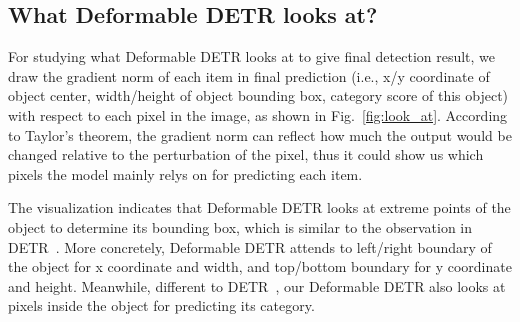 \documentclass{article}
\begin{document}
\subsection{What Deformable DETR looks at?}
\label{sec:look_at}

 For studying what Deformable DETR looks at to give final detection result, we draw the gradient norm of each item in final prediction (i.e., x/y coordinate of object center, width/height of object bounding box, category score of this object) with respect to each pixel in the image, as shown in Fig.~\ref{fig:look_at}. According to Taylor's theorem, the gradient norm can reflect how much the output would be changed relative to the perturbation of the pixel, thus it could show us which pixels the model mainly relys on for predicting each item. 

 The visualization indicates that Deformable DETR looks at extreme points of the object to determine its bounding box, which is similar to the observation in DETR~\citep{carion2020end}. More concretely, Deformable DETR attends to left/right boundary of the object for x coordinate and width, and top/bottom boundary for y coordinate and height. Meanwhile, different to DETR~\citep{carion2020end}, our Deformable DETR also looks at pixels inside the object for predicting its category.
\end{document}

